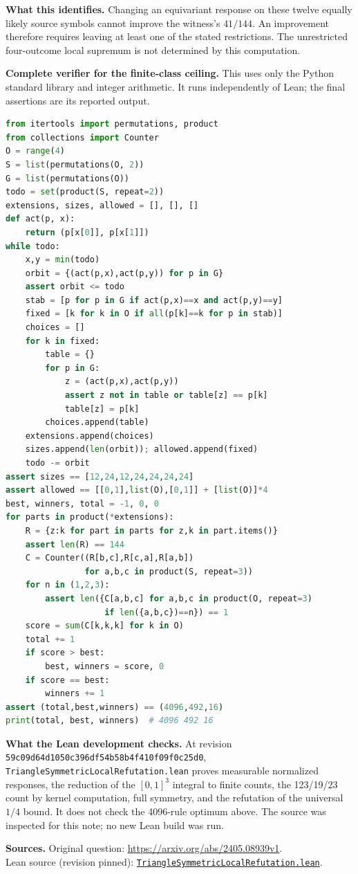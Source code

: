 \documentclass[11pt]{article}
\begin{document}
\textbf{What this identifies.}
Changing an equivariant response on these twelve equally likely source symbols
cannot improve the witness's $41/144$. An improvement therefore requires leaving
at least one of the stated restrictions. The unrestricted four-outcome local
supremum is not determined by this computation.

\newpage
\textbf{Complete verifier for the finite-class ceiling.}
This uses only the Python standard library and integer arithmetic. It runs
independently of Lean; the final assertions are its reported output.
\begin{lstlisting}[language=Python,basicstyle=\ttfamily\scriptsize]
from itertools import permutations, product
from collections import Counter
O = range(4)
S = list(permutations(O, 2))
G = list(permutations(O))
todo = set(product(S, repeat=2))
extensions, sizes, allowed = [], [], []
def act(p, x):
    return (p[x[0]], p[x[1]])
while todo:
    x,y = min(todo)
    orbit = {(act(p,x),act(p,y)) for p in G}
    assert orbit <= todo
    stab = [p for p in G if act(p,x)==x and act(p,y)==y]
    fixed = [k for k in O if all(p[k]==k for p in stab)]
    choices = []
    for k in fixed:
        table = {}
        for p in G:
            z = (act(p,x),act(p,y))
            assert z not in table or table[z] == p[k]
            table[z] = p[k]
        choices.append(table)
    extensions.append(choices)
    sizes.append(len(orbit)); allowed.append(fixed)
    todo -= orbit
assert sizes == [12,24,12,24,24,24,24]
assert allowed == [[0,1],list(O),[0,1]] + [list(O)]*4
best, winners, total = -1, 0, 0
for parts in product(*extensions):
    R = {z:k for part in parts for z,k in part.items()}
    assert len(R) == 144
    C = Counter((R[b,c],R[c,a],R[a,b])
                for a,b,c in product(S, repeat=3))
    for n in (1,2,3):
        assert len({C[a,b,c] for a,b,c in product(O, repeat=3)
                    if len({a,b,c})==n}) == 1
    score = sum(C[k,k,k] for k in O)
    total += 1
    if score > best:
        best, winners = score, 0
    if score == best:
        winners += 1
assert (total,best,winners) == (4096,492,16)
print(total, best, winners)  # 4096 492 16
\end{lstlisting}

\textbf{What the Lean development checks.}
At revision\\
\texttt{59c09d64d1050c396df54b58b4f410f09f0c25d0},\\
\texttt{TriangleSymmetricLocalRefutation.lean} proves measurable normalized
responses, the reduction of the $[0,1]^3$ integral to finite counts, the
123/19/23 count by kernel computation, full symmetry, and the refutation of
the universal $1/4$ bound. It does not check the 4096-rule optimum above.
The source was inspected for this note; no new Lean build was run.

\textbf{Sources.}
Original question: \url{https://arxiv.org/abs/2405.08939v1}.\\
Lean source (revision pinned):
\href{https://github.com/the-omega-institute/trureturing/blob/59c09d64d1050c396df54b58b4f410f09f0c25d0/D5/S3/Quantum/Entanglement/TriangleSymmetricLocalRefutation.lean}{\texttt{TriangleSymmetricLocalRefutation.lean}}.
\end{document}
